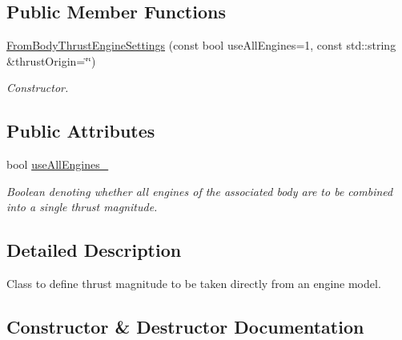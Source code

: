 \subsection*{Public Member Functions}
\begin{DoxyCompactItemize}
\item 
\hyperlink{classtudat_1_1simulation__setup_1_1FromBodyThrustEngineSettings_adaa1620d4ad4d3b7f87e70067063a994}{From\+Body\+Thrust\+Engine\+Settings} (const bool use\+All\+Engines=1, const std\+::string \&thrust\+Origin=\char`\"{}\char`\"{})
\begin{DoxyCompactList}\small\item\em Constructor. \end{DoxyCompactList}\end{DoxyCompactItemize}
\subsection*{Public Attributes}
\begin{DoxyCompactItemize}
\item 
bool \hyperlink{classtudat_1_1simulation__setup_1_1FromBodyThrustEngineSettings_a6c42d12482f4532b56c124509bf6a5d1}{use\+All\+Engines\+\_\+}\hypertarget{classtudat_1_1simulation__setup_1_1FromBodyThrustEngineSettings_a6c42d12482f4532b56c124509bf6a5d1}{}\label{classtudat_1_1simulation__setup_1_1FromBodyThrustEngineSettings_a6c42d12482f4532b56c124509bf6a5d1}

\begin{DoxyCompactList}\small\item\em Boolean denoting whether all engines of the associated body are to be combined into a single thrust magnitude. \end{DoxyCompactList}\end{DoxyCompactItemize}


\subsection{Detailed Description}
Class to define thrust magnitude to be taken directly from an engine model. 

\subsection{Constructor \& Destructor Documentation}
